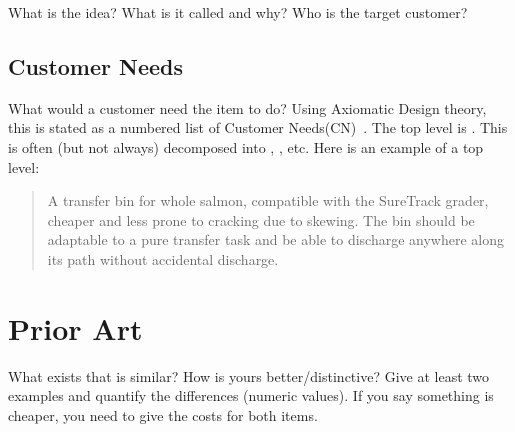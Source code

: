 \documentclass[sn-mathphys,pdflatex]{sn-jnl}%
\theoremstyle{thmstyleone}%
\theoremstyle{thmstyletwo}%
\theoremstyle{thmstylethree}%
\begin{document}
What is the idea?  What is it called and why?
Who is the target customer?



\subsection{Customer Needs}\label{sec:customer-needs}
What would a customer need the item to do?  
Using Axiomatic Design theory, this is stated as a numbered list of Customer Needs(CN)~\cite{suh1990principles}.
The top level is .
This is often (but not always) decomposed into , , etc.
Here is an example of a top level:

\begin{quote} \textbf{} A transfer bin for whole salmon, compatible with the SureTrack grader, cheaper and less prone to cracking due to skewing.  
The bin should be adaptable to a pure transfer task and be able to discharge anywhere along its path without
accidental discharge.~\cite{gerhard2016suretrack}
\end{quote}


\section{Prior Art}\label{sec:prior-art}
What exists that is similar?  How is yours better/distinctive?
Give at least two examples and quantify the differences (numeric values).
If you say something is cheaper, you need to give the costs for both items.
\end{document}
